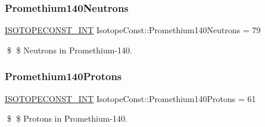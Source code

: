 \subsubsection{\texorpdfstring{Promethium140\+Neutrons}{Promethium140Neutrons}}
{\footnotesize\ttfamily \mbox{\hyperlink{group___isotope_const-_macros_ga5f18360b3e99483a35c32d789e62621c}{I\+S\+O\+T\+O\+P\+E\+C\+O\+N\+S\+T\+\_\+\+I\+NT}} Isotope\+Const\+::\+Promethium140\+Neutrons = 79}

\$ \$ Neutrons in Promethium-\/140. \mbox{\label{group___isotope_const-_promethium-_pm140_gac95775360e36bdea3048b143670de5ea}} 
\subsubsection{\texorpdfstring{Promethium140\+Protons}{Promethium140Protons}}
{\footnotesize\ttfamily \mbox{\hyperlink{group___isotope_const-_macros_ga5f18360b3e99483a35c32d789e62621c}{I\+S\+O\+T\+O\+P\+E\+C\+O\+N\+S\+T\+\_\+\+I\+NT}} Isotope\+Const\+::\+Promethium140\+Protons = 61}

\$ \$ Protons in Promethium-\/140. 